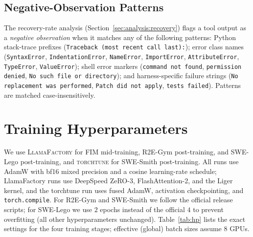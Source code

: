 \subsection{Negative-Observation Patterns}
\label{app:algo:neg_patterns}

The recovery-rate analysis (Section~\ref{sec:analysis:recovery}) flags
a tool output as a \emph{negative observation} when it matches any of
the following patterns: Python stack-trace prefixes
(\texttt{Traceback (most recent call last):}); error class names
(\texttt{SyntaxError}, \texttt{IndentationError}, \texttt{NameError},
\texttt{ImportError}, \texttt{AttributeError}, \texttt{TypeError},
\texttt{ValueError}); shell error markers
(\texttt{command not found}, \texttt{permission denied}, \texttt{No such file or directory});
and harness-specific failure strings
(\texttt{No replacement was performed}, \texttt{Patch did not apply},
\texttt{tests failed}). Patterns are matched case-insensitively.

\section{Training Hyperparameters}
\label{app:hp}

We use \textsc{LlamaFactory} for FIM mid-training, R2E-Gym
post-training, and SWE-Lego post-training, and \textsc{torchtune} for
SWE-Smith post-training. All runs use AdamW with bf16 mixed precision
and a cosine learning-rate schedule; LlamaFactory runs use DeepSpeed
ZeRO-3, FlashAttention-2, and the Liger kernel, and the torchtune run
uses fused AdamW, activation checkpointing, and \texttt{torch.compile}.
For R2E-Gym and SWE-Smith we follow the official release scripts; for
SWE-Lego we use $2$ epochs instead of the official $4$ to prevent
overfitting (all other hyperparameters unchanged). Table~\ref{tab:hp}
lists the exact settings for the four training stages; effective
(global) batch sizes assume $8$ GPUs.


